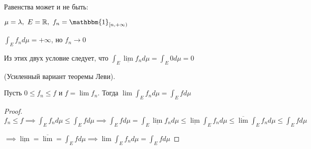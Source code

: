 \begin{remark}
    Равенства может и не быть:

    $\mu = \lambda, \ E = \mathbb{R}, \ f_n = \mathbbm{1}_{[n, +\infty)}$

    $\int_E{f_n d \mu} = +\infty$, но $f_n \rightarrow 0$

    Из этих двух условие следует, что $\int_E{\underline{\lim}{f_n d \mu}} = \int_E{0 d \mu} = 0$
\end{remark}



\begin{consequence}
    (Усиленный вариант теоремы Леви).

    Пусть $0 \leq f_n \leq f$ и $f = \lim{f_n}$. Тогда $\lim{\int_E{f_n d \mu}} = \int_E{f d \mu}$
\end{consequence}
\begin{proof}
    $f_n \leq f \implies \int_E{f_n d \mu} \leq \int_E{f d \mu} \implies \int_E{f d \mu} = \int_E{\underline{\lim}{f_n} d \mu} \leq \underline{\lim}{\int_E{f_n d \mu}} \leq \overline{\lim}{\int_E{f_n d \mu}} \leq \int_E{f d \mu}$

    $\implies \underline{\lim} = \overline{\lim} = \int_E{f d \mu} \implies \lim{\int_E{f_n d \mu}} = \int_E{f d \mu}$
\end{proof}

